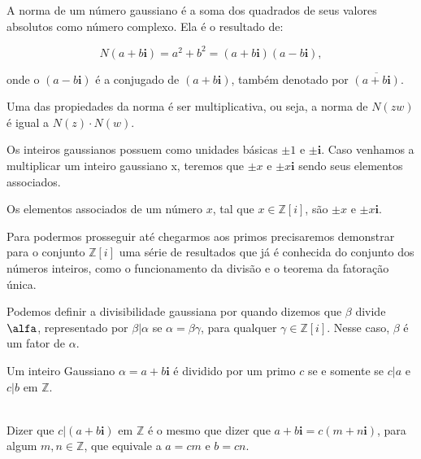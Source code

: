\begin{Df}
A norma de um n\'umero gaussiano \'e a soma dos quadrados de seus valores absolutos como n\'umero complexo. Ela \'e o resultado de:

$$N(a+b\textbf{i}) = a^2 + b^2 = (a+b\textbf{i})(a-b\textbf{i}),$$

onde o $(a-b\textbf{i})$ \'e a conjugado de $(a+b\textbf{i})$, tamb\'em denotado por $\overline{(a+b\textbf{i})}$.
\end{Df}

Uma das propiedades da norma \'e ser multiplicativa, ou seja, a norma de $N(zw)$ \'e igual a $N(z) \cdot N(w)$.

Os inteiros gaussianos possuem como unidades b\'asicas $\pm 1$ e $\pm \textbf{i}$. Caso venhamos a multiplicar um inteiro gaussiano x, teremos que $\pm x$ e $\pm x\textbf{i}$ sendo seus elementos associados.

\begin{Df}

Os elementos associados de um n\'umero $x$, tal que $x \in \mathbb{Z}[i]$, s\~ao $\pm x$ e $\pm x\textbf{i}$.

\end{Df}

Para podermos prosseguir at\'e chegarmos aos primos precisaremos demonstrar para o conjunto $\mathbb{Z}[i]$ uma s\'erie de resultados que j\'a \'e conhecida do conjunto dos n\'umeros inteiros, como o funcionamento da divis\~ao e o teorema da fatora\c{c}\~ao \'unica.

Podemos definir a divisibilidade gaussiana por quando dizemos que $\beta$ divide $\alfa$, representado por $\beta | \alpha$ se $\alpha = \beta \gamma$, para qualquer $\gamma \in \mathbb{Z}[i] $. Nesse caso, $\beta$ \'e um fator de $\alpha$.

\begin{Th}\label{div_gaussiana1}

Um inteiro Gaussiano $\alpha = a+b\textbf{i}$ \'e dividido por um primo $c$ se e somente se $c|a$ e $c|b$ em $\mathbb{Z}$.

\end{Th}

\\

Dizer que $c|(a+b\textbf{i})$ em $\mathbb{Z}$ \'e o mesmo que dizer que $a+b\textbf{i} = c(m +  n\textbf{i})$, para algum $m, n \in \mathbb{Z}$, que equivale a $a=cm$ e $b=cn$.

\hfill\newline


